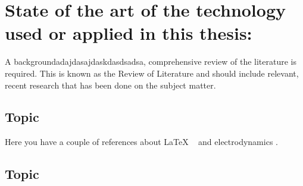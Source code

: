\clearpage\section{State of the art of the technology used or applied in this thesis:}

 {A backgroundadajdasajdaskdasdsadsa, comprehensive review of the literature is required. This is known as the Review of Literature and should
  include relevant, recent research that has been done on the subject matter.}

\subsection{Topic}

Here you have a couple of references about LaTeX ~\cite{latexcompanion} and electrodynamics \cite{einstein}.

\bigskip

\subsection{Topic}
